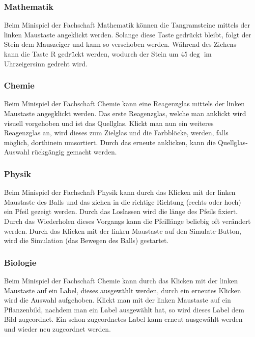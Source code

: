 \subsubsection{Mathematik}

Beim Minispiel der Fachschaft Mathematik können die Tangramsteine mittels der linken Maustaste angeklickt werden.
Solange diese Taste gedrückt bleibt, folgt der Stein dem Mauszeiger und kann so verschoben werden.
Während des Ziehens kann die Taste \glqq R \grqq{} gedrückt werden, wodurch der Stein um $45\deg$ im Uhrzeigersinn gedreht wird.

\subsubsection{Chemie}

Beim Minispiel der Fachschaft Chemie kann eine Reagenzglas mittels der linken Maustaste angegklickt werden. Das erste Reagenzglas, welche man anklickt wird visuell vorgehoben und ist das Quellglas.
Klickt man nun ein weiteres Reagenzglas an, wird dieses zum Zielglas und die Farbblöcke, werden, falls möglich, dorthinein umsortiert.
Durch das erneute anklicken, kann die Quellglas-Auswahl rückgängig gemacht werden.

\subsubsection{Physik}

Beim Minispiel der Fachschaft Physik kann durch das Klicken mit der linken Maustaste des Balls und das ziehen in die richtige Richtung (rechts oder hoch) ein Pfeil gezeigt werden.
Durch das Loslassen wird die länge des Pfeils fixiert. Durch das Wiederholen dieses Vorgangs kann die Pfeillänge beliebig oft verändert werden.
Durch das Klicken mit der linken Maustaste auf den Simulate-Button, wird die Simulation (das Bewegen des Balls) gestartet.

\subsubsection{Biologie}
Beim Minispiel der Fachschaft Chemie kann durch das Klicken mit der linken Maustaste auf ein Label, dieses ausgewählt werden, durch ein erneutes Klicken wird die Auswahl aufgehoben.
Klickt man mit der linken Maustaste auf ein Pflanzenbild, nachdem man ein Label ausgewählt hat, so wird dieses Label dem Bild zugeordnet. Ein schon zugeordnetes Label kann erneut ausgewählt werden und wieder neu zugeordnet werden.

